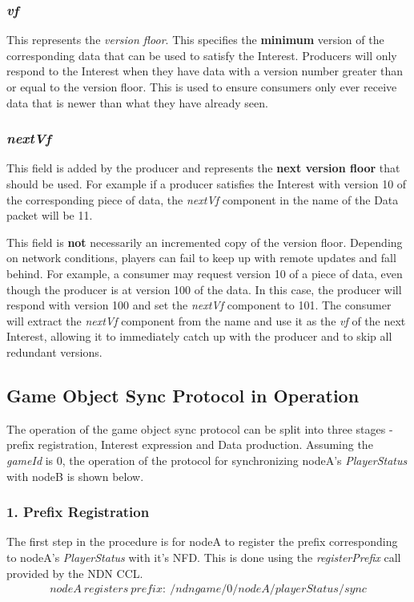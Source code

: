 \subsubsection{\textit{vf}}
This represents the \textit{version floor}. This specifies the \textbf{minimum} version of the corresponding data that can be used to satisfy the Interest. Producers will only respond to the Interest when they have data with a version number greater than or equal to the version floor. This is used to ensure consumers only ever receive data that is newer than what they have already seen.

\subsubsection{\textit{nextVf}}
This field is added by the producer and represents the \textbf{next version floor} that should be used. For example if a producer satisfies the Interest with version 10 of the corresponding piece of data, the \textit{nextVf} component in the name of the Data packet will be 11.

This field is \textbf{not} necessarily an incremented copy of the version floor. Depending on network conditions, players can fail to keep up with remote updates and fall behind. For example, a consumer may request version 10 of a piece of data, even though the producer is at version 100 of the data. In this case, the producer will respond with version 100 and set the \textit{nextVf} component to 101. The consumer will extract the \textit{nextVf} component from the name and use it as the \textit{vf} of the next Interest, allowing it to immediately catch up with the producer and to skip all redundant versions.


\subsection{Game Object Sync Protocol in Operation}
The operation of the game object sync protocol can be split into three stages - prefix registration, Interest expression and Data production. Assuming the \textit{gameId} is 0, the operation of the protocol for synchronizing nodeA's \textit{PlayerStatus} with nodeB is shown below.

\subsubsection{1. Prefix Registration}
The first step in the procedure is for nodeA to register the prefix corresponding to nodeA's \textit{PlayerStatus} with it's NFD. This is done using the \textit{registerPrefix} call provided by the NDN CCL.
\begin{align*}
    nodeA\ registers\ prefix:\ /ndngame/0/nodeA/playerStatus/sync
\end{align*}



